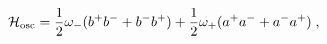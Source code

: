 \begin{equation}\label{osc}
 {\cal H}_{\rm osc}=
 \frac{1}{2}\omega_-(b^+b^- +b^-b^+)+
\frac{1}{2}\omega_+(a^+a^-+
 a^-a^+)\;,
\label{t3}\end{equation}

